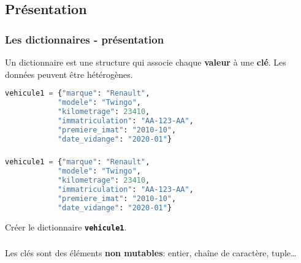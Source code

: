\documentclass[svgnames,11pt]{beamer}
\begin{document}
\subsection{Présentation}
\begin{frame}[fragile]
    \frametitle{Les dictionnaires - présentation}

    \begin{aretenir}[]
    Un dictionnaire est une structure qui associe chaque \textbf{valeur} à une \textbf{clé}. Les données peuvent être hétérogènes.
    \end{aretenir}
\begin{center}
\begin{lstlisting}[language=Python , basicstyle=\ttfamily\small, xleftmargin=2em, xrightmargin=2em]
vehicule1 = {"marque": "Renault", 
            "modele": "Twingo", 
            "kilometrage": 23410, 
            "immatriculation": "AA-123-AA", 
            "premiere_imat": "2010-10", 
            "date_vidange": "2020-01"}
\end{lstlisting}
\label{CODE}
\end{center}
\end{frame}
\begin{frame}[fragile]
    \frametitle{}

\begin{center}
\begin{lstlisting}[language=Python , basicstyle=\ttfamily\small, xleftmargin=2em, xrightmargin=2em]
vehicule1 = {"marque": "Renault", 
            "modele": "Twingo", 
            "kilometrage": 23410, 
            "immatriculation": "AA-123-AA", 
            "premiere_imat": "2010-10", 
            "date_vidange": "2020-01"}
\end{lstlisting}
\label{CODE}
\end{center} 
\begin{activite}
Créer le dictionnaire \textbf{\texttt{vehicule1}}.
\end{activite}
\end{frame}
\begin{frame}
    \frametitle{}

    \begin{aretenir}[]
    Les clés sont des éléments \textbf{non mutables}: entier, chaîne de caractère, tuple\dots
    \end{aretenir}

\end{frame}
\end{document}

